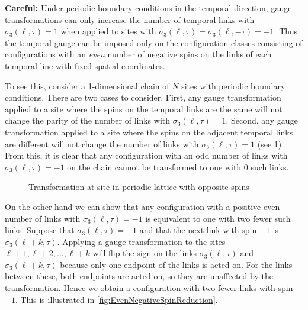 \documentclass[10pt,reqno]{amsart}
\numberwithin{equation}{section}
\begin{document}
	
	\textbf{Careful:} Under periodic boundary conditions in the temporal direction, gauge transformations can only increase the number of temporal links with $\sigma_3(\ell,\tau)=1$ when applied to sites with $\sigma_3(\ell,\tau)=\sigma_3(\ell,-\tau)=-1$.
	Thus the temporal gauge can be imposed only on the configuration classes consisting of configurations with an \emph{even} number of negative spins on the links of each temporal line with fixed spatial coordinates.
	
	To see this, consider a 1-dimensional chain of $N$ sites with periodic boundary conditions. 
	There are two cases to consider.
	First, any gauge transformation applied to a site where the spins on the temporal links are the same will not change the parity of the number of links with $\sigma_3(\ell,\tau)=1$.
	Second, any gauge transformation applied to a site where the spins on the adjacent temporal links are different will not change the number of links with $\sigma_3(\ell,\tau)=1$ (see \cref{fig:periodicSpinOddCountTransform}).
	From this, it is clear that any configuration with an odd number of links with $\sigma_3(\ell,\tau)=-1$ on the chain cannot be transformed to one with 0 such links.
	
	\begin{figure}[h!]
		\caption{Transformation at site in periodic lattice with opposite spins}
		\label{fig:periodicSpinOddCountTransform}
	\end{figure}

	On the other hand we can show that any configuration with a positive even number of links with $\sigma_3(\ell,\tau)=-1$ is equivalent to one with two fewer such links.
	Suppose that $\sigma_3(\ell,\tau)=-1$ and that the next link with spin $-1$ is $\sigma_3(\ell+k,\tau)$.
	Applying a gauge transformation to the sites $\ell+1,\ell+2,\ldots, \ell+k$ will flip the sign on the links $\sigma_3(\ell,\tau)$ and $\sigma_3(\ell+k,\tau)$ because only one endpoint of the links is acted on.
	For the links between these, both endpoints are acted on, so they are unaffected by the transformation.
	Hence we obtain a configuration with two fewer links with spin $-1$. This is illustrated in \cref{fig:EvenNegativeSpinReduction}.
	
\end{document}
